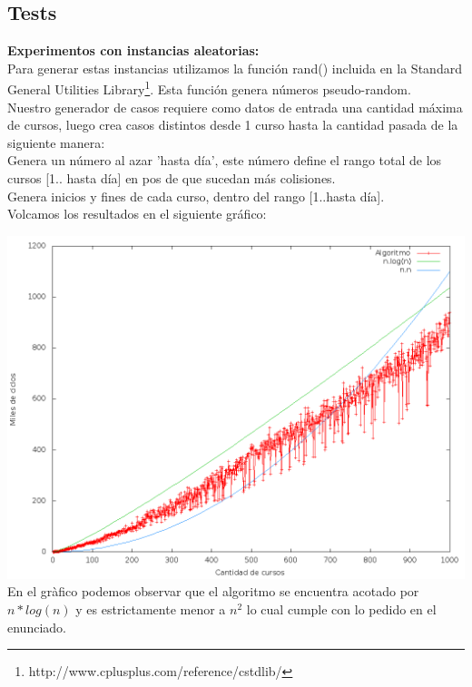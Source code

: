 \subsection{Tests}
\textbf{Experimentos con instancias aleatorias:}\\

Para generar estas instancias utilizamos la función rand() incluida en la Standard General Utilities Library\footnote{http://www.cplusplus.com/reference/cstdlib/}. Esta función genera números pseudo-random.\\

Nuestro generador de casos requiere como datos de entrada una cantidad máxima de cursos, luego crea casos distintos desde 1 curso hasta la cantidad pasada de la siguiente manera:\\
Genera un número al azar 'hasta día', este número define el rango total de los cursos [1.. hasta día] en pos de que sucedan más colisiones.\\
Genera inicios y fines de cada curso, dentro del rango [1..hasta día].\\

Volcamos los resultados en el siguiente gráfico:

\includegraphics[scale=0.35]{ej2/Graficos/1000casos.png}\\

En el gràfico podemos observar que el algoritmo se encuentra acotado por $n*log(n)$ y es estrictamente menor a $n^2$ lo cual cumple con lo pedido en el enunciado.

